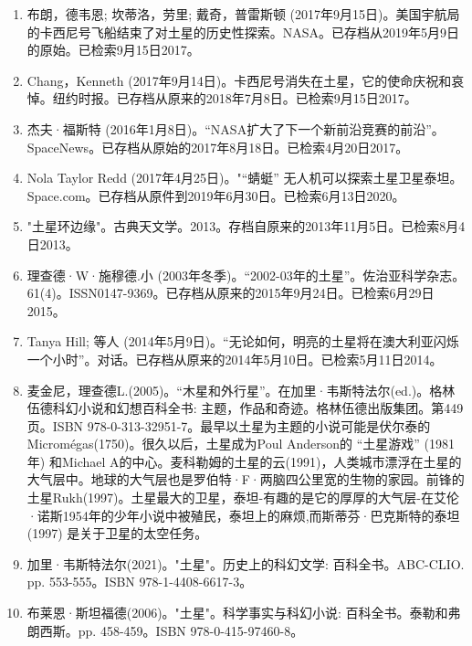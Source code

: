 \begin{enumerate}
\item 布朗，德韦恩; 坎蒂洛，劳里; 戴奇，普雷斯顿 (2017年9月15日)。美国宇航局的卡西尼号飞船结束了对土星的历史性探索。NASA。已存档从2019年5月9日的原始。已检索9月15日2017。
\item Chang，Kenneth (2017年9月14日)。卡西尼号消失在土星，它的使命庆祝和哀悼。纽约时报。已存档从原来的2018年7月8日。已检索9月15日2017。
\item 杰夫·福斯特 (2016年1月8日)。“NASA扩大了下一个新前沿竞赛的前沿”。SpaceNews。已存档从原始的2017年8月18日。已检索4月20日2017。
\item Nola Taylor Redd (2017年4月25日)。"“蜻蜓” 无人机可以探索土星卫星泰坦。Space.com。已存档从原件到2019年6月30日。已检索6月13日2020。
\item "土星环边缘"。古典天文学。2013。存档自原来的2013年11月5日。已检索8月4日2013。
\item 理查德·W·施穆德.小 (2003年冬季)。“2002-03年的土星”。佐治亚科学杂志。61(4)。ISSN0147-9369。已存档从原来的2015年9月24日。已检索6月29日2015。 
\item Tanya Hill; 等人 (2014年5月9日)。“无论如何，明亮的土星将在澳大利亚闪烁一个小时”。对话。已存档从原来的2014年5月10日。已检索5月11日2014。
\item 麦金尼，理查德L.(2005)。“木星和外行星”。在加里·韦斯特法尔(ed.)。格林伍德科幻小说和幻想百科全书: 主题，作品和奇迹。格林伍德出版集团。第449页。ISBN 978-0-313-32951-7。最早以土星为主题的小说可能是伏尔泰的Micromégas(1750)。很久以后，土星成为Poul Anderson的 “土星游戏” (1981年) 和Michael A的中心。麦科勒姆的土星的云(1991)，人类城市漂浮在土星的大气层中。地球的大气层也是罗伯特·F·两脑四公里宽的生物的家园。前锋的土星Rukh(1997)。土星最大的卫星，泰坦-有趣的是它的厚厚的大气层-在艾伦·诺斯1954年的少年小说中被殖民，泰坦上的麻烦,而斯蒂芬·巴克斯特的泰坦(1997) 是关于卫星的太空任务。
\item 加里·韦斯特法尔(2021)。"土星"。历史上的科幻文学: 百科全书。ABC-CLIO. pp. 553-555。ISBN 978-1-4408-6617-3。
\item 布莱恩·斯坦福德(2006)。"土星"。科学事实与科幻小说: 百科全书。泰勒和弗朗西斯。pp. 458-459。ISBN 978-0-415-97460-8。
\end{enumerate}










